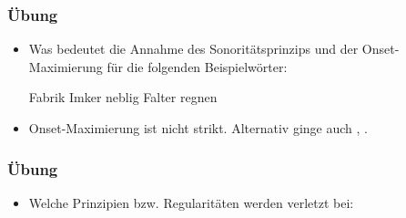 {
%

\begin{frame}
\frametitle{Übung}

\begin{itemize}
	\item Was bedeutet die Annahme des Sonoritätsprinzips und der Onset-Maximierung für die folgenden Beispielwörter:

	\eal
	\settowidth{}
	\ex Fabrik
	\ex Imker
	\ex neblig
	\ex Falter
	\ex regnen
		
	
	\zl
	
	\item<9-> Onset-Maximierung ist nicht strikt. Alternativ ginge auch \textipa{[ne:p.lI\c{c}]}, \textipa{[\textscr e:k.n@n]}.
	
\end{itemize}

\end{frame}	

\begin{frame}
\frametitle{Übung}
	\begin{itemize}

	\item Welche Prinzipien bzw. Regularitäten werden verletzt bei:


	\eal
	\settowidth{}
	
		\ex \textipa{[PE.b@]}
		\ex \textipa{[PEb.@]}
		\ex \textipa{[PEp.@]}
		\ex \textipa{[PEp.b@]}
	\zl


\end{itemize}
\end{frame}}
